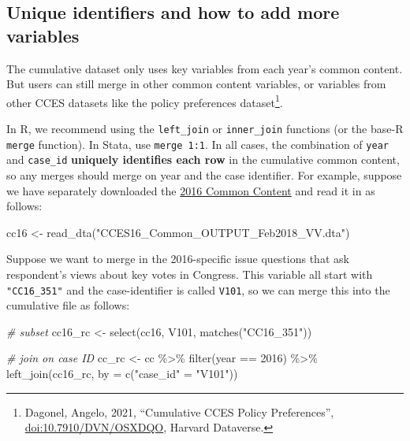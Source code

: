 \documentclass[10pt,article,oneside]{memoir}
\theoremstyle{definition}
\newenvironment{Shaded}{\begin{snugshade}}{\end{snugshade}}
\newcommand{\AttributeTok}[1]{\textcolor[rgb]{0.77,0.63,0.00}{#1}}
\newcommand{\CommentTok}[1]{\textcolor[rgb]{0.56,0.35,0.01}{\textit{#1}}}
\newcommand{\DecValTok}[1]{\textcolor[rgb]{0.00,0.00,0.81}{#1}}
\newcommand{\FunctionTok}[1]{\textcolor[rgb]{0.00,0.00,0.00}{#1}}
\newcommand{\NormalTok}[1]{#1}
\newcommand{\OtherTok}[1]{\textcolor[rgb]{0.56,0.35,0.01}{#1}}
\newcommand{\SpecialCharTok}[1]{\textcolor[rgb]{0.00,0.00,0.00}{#1}}
\newcommand{\StringTok}[1]{\textcolor[rgb]{0.31,0.60,0.02}{#1}}
\begin{document}
\hypertarget{unique-identifiers-and-how-to-add-more-variables}{%
\subsection{Unique identifiers and how to add more
variables}\label{unique-identifiers-and-how-to-add-more-variables}}

The cumulative dataset only uses key variables from each year's common
content. But users can still merge in other common content variables, or
variables from other CCES datasets like the policy preferences
dataset\footnote{Dagonel, Angelo, 2021, ``Cumulative CCES Policy Preferences'', \href{https://dataverse.harvard.edu/dataset.xhtml?persistentId=doi:10.7910/DVN/OSXDQO}{\url{doi:10.7910/DVN/OSXDQO}}, Harvard Dataverse.}.

In R, we recommend using the \texttt{left\_join} or \texttt{inner\_join}
functions (or the base-R \texttt{merge} function). In Stata, use
\texttt{merge\ 1:1}. In all cases, the combination of \texttt{year} and
\texttt{case\_id} \textbf{uniquely identifies each row} in the
cumulative common content, so any merges should merge on year and the
case identifier. For example, suppose we have separately downloaded the
\href{https://doi.org/10.7910/DVN/GDF6Z0/JPMOZZ}{2016 Common Content}
and read it in as follows:

\begin{Shaded}
\begin{Highlighting}[]
\NormalTok{cc16 }\OtherTok{\textless{}{-}} \FunctionTok{read\_dta}\NormalTok{(}\StringTok{"CCES16\_Common\_OUTPUT\_Feb2018\_VV.dta"}\NormalTok{)}
\end{Highlighting}
\end{Shaded}

Suppose we want to merge in the 2016-specific issue questions that ask
respondent's views about key votes in Congress. This variable all start
with \texttt{"CC16\_351"} and the case-identifier is called
\texttt{V101}, so we can merge this into the cumulative file as follows:

\begin{Shaded}
\begin{Highlighting}[]
\CommentTok{\# subset}
\NormalTok{cc16\_rc }\OtherTok{\textless{}{-}} \FunctionTok{select}\NormalTok{(cc16, V101, }\FunctionTok{matches}\NormalTok{(}\StringTok{"CC16\_351"}\NormalTok{))}

\CommentTok{\# join on case ID}
\NormalTok{cc\_rc }\OtherTok{\textless{}{-}}\NormalTok{ cc }\SpecialCharTok{\%\textgreater{}\%} 
  \FunctionTok{filter}\NormalTok{(year }\SpecialCharTok{==} \DecValTok{2016}\NormalTok{) }\SpecialCharTok{\%\textgreater{}\%} 
  \FunctionTok{left\_join}\NormalTok{(cc16\_rc, }\AttributeTok{by =} \FunctionTok{c}\NormalTok{(}\StringTok{"case\_id"} \OtherTok{=} \StringTok{"V101"}\NormalTok{))}
\end{Highlighting}
\end{Shaded}
\end{document}

